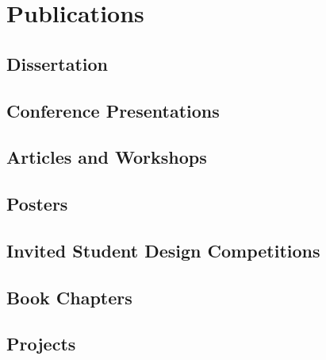 \documentclass[
]{report}
\begin{document}
\hypertarget{publications}{%
\chapter{Publications}\label{publications}}

\hypertarget{dissertation}{%
\section{Dissertation}\label{dissertation}}

\hypertarget{refs_dissertation}{}

\hypertarget{conference-presentations}{%
\section{Conference Presentations}\label{conference-presentations}}

\hypertarget{refs_presentations}{}

\hypertarget{articles-and-workshops}{%
\section{Articles and Workshops}\label{articles-and-workshops}}

\hypertarget{refs_misc}{}

\hypertarget{posters}{%
\section{Posters}\label{posters}}

\hypertarget{refs_posters}{}

\hypertarget{invited-student-design-competitions}{%
\section{Invited Student Design
Competitions}\label{invited-student-design-competitions}}

\hypertarget{refs_competitions}{}

\hypertarget{book-chapters}{%
\section{Book Chapters}\label{book-chapters}}

\hypertarget{refs_chapters}{}

\hypertarget{projects}{%
\section{Projects}\label{projects}}
\end{document}
